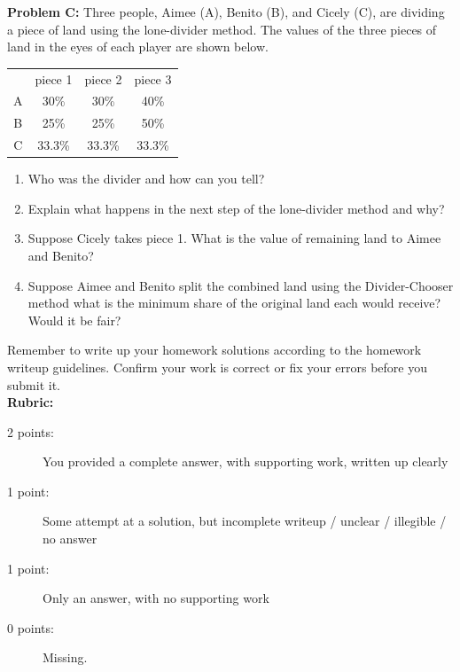 \documentclass[11pt, oneside]{article}
\begin{document}
        \newpage
	
\textbf{Problem C:} Three people, Aimee (A), Benito (B), and Cicely (C), are dividing a piece of land using the lone-divider method. The values of the three pieces of land in the eyes of each player are shown below.

\begin{tabular}{| c || c | c | c |}
\hline
& piece 1 & piece 2 & piece 3 \\
A&30\%&30\% &40\%\\
B&25\%&25\%&50\%\\
C &33.3\%&33.3\%&33.3\%\\
\hline
\end{tabular}

	\begin{enumerate}
	\item Who was the divider and how can you tell?
	\item Explain what happens in the next step of the lone-divider method and why?
	\item Suppose Cicely takes piece 1. What is the value of remaining land to Aimee and Benito?
	\item Suppose Aimee and Benito split the combined land using the Divider-Chooser method what is the minimum share of the original land each would receive? Would it be fair?
	\end{enumerate}
\vfill
Remember to write up your homework solutions according to the homework writeup guidelines. Confirm your work is correct or fix your errors before you submit it. \\
\vfill
\textbf{Rubric:}

\begin{description}
\item[2 points:] You provided a complete answer, with supporting work, written up clearly
\item[1 point:] Some attempt at a solution, but incomplete writeup / unclear / illegible / no answer
\item[1 point:] Only an answer, with no supporting work 
\item[0 points:] Missing.
\end{description}
\end{document}
